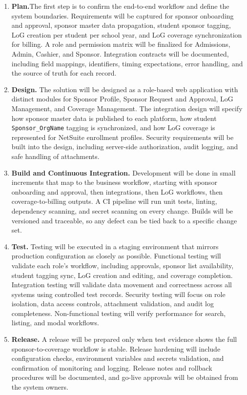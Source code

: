         \begin{enumerate}
            \item \textbf{Plan.}The first step is to confirm the end-to-end workflow and define the system boundaries. Requirements will be captured for sponsor onboarding and approval, sponsor master data propagation, student sponsor tagging, LoG creation per student per school year, and LoG coverage synchronization for billing. A role and permission matrix will be finalized for Admissions, Admin, Cashier, and Sponsor. Integration contracts will be documented, including field mappings, identifiers, timing expectations, error handling, and the source of truth for each record.
            \item \textbf{Design.} The solution will be designed as a role-based web application with distinct modules for Sponsor Profile, Sponsor Request and Approval, LoG Management, and Coverage Management. The integration design will specify how sponsor master data is published to each platform, how student \texttt{Sponsor\_OrgName} tagging is synchronized, and how LoG coverage is represented for NetSuite enrollment profiles. Security requirements will be built into the design, including server-side authorization, audit logging, and safe handling of attachments.
            \item \textbf{Build and Continuous Integration.} Development will be done in small increments that map to the business workflow, starting with sponsor onboarding and approval, then integrations, then LoG workflows, then coverage-to-billing outputs. A CI pipeline will run unit tests, linting, dependency scanning, and secret scanning on every change. Builds will be versioned and traceable, so any defect can be tied back to a specific change set.
            \item \textbf{Test.} Testing will be executed in a staging environment that mirrors production configuration as closely as possible. Functional testing will validate each role’s workflow, including approvals, sponsor list availability, student tagging sync, LoG creation and editing, and coverage completion. Integration testing will validate data movement and correctness across all systems using controlled test records. Security testing will focus on role isolation, data access controls, attachment validation, and audit log completeness. Non-functional testing will verify performance for search, listing, and modal workflows.
            \item \textbf{Release.} A release will be prepared only when test evidence shows the full sponsor-to-coverage workflow is stable. Release hardening will include configuration checks, environment variables and secrets validation, and confirmation of monitoring and logging. Release notes and rollback procedures will be documented, and go-live approvals will be obtained from the system owners.

\end{enumerate}
